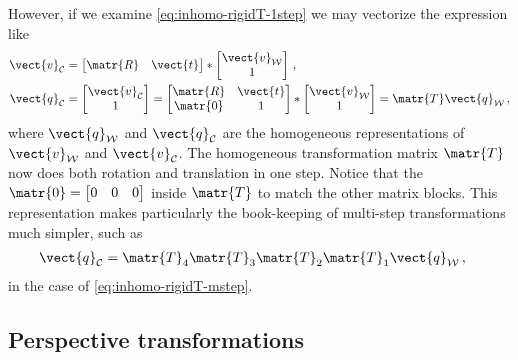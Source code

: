 \documentclass[oneandhalfcolumn]{coursenotes-handout}
\begin{document}
However, if we examine \cref{eq:inhomo-rigidT-1step} we may vectorize the expression like
\begin{align}
    \vect{v}_{\mathcal{C}} &= \begin{bmatrix} \matr{R} & \vect{t} \end{bmatrix} * \begin{bmatrix} \vect{v}_{\mathcal{W}} \\ 1 \end{bmatrix} \,, \\
    \vect{q}_{\mathcal{C}} &= \begin{bmatrix} \vect{v}_{\mathcal{C}} \\ 1 \end{bmatrix} = \begin{bmatrix} \matr{R} & \vect{t} \\ \matr{0} & 1 \end{bmatrix} * \begin{bmatrix} \vect{v}_{\mathcal{W}} \\ 1 \end{bmatrix} = \matr{T} \vect{q}_{\mathcal{W}} \,,
\end{align}
where \(\vect{q}_{\mathcal{W}}\) and \(\vect{q}_{\mathcal{C}}\) are the homogeneous representations of \(\vect{v}_{\mathcal{W}}\) and \(\vect{v}_{\mathcal{C}}\). The homogeneous transformation matrix \(\matr{T}\) now does both rotation and translation in one step. Notice that the \(\matr{0} = \begin{bmatrix} 0 & 0 & 0 \end{bmatrix}\) inside \(\matr{T}\) to match the other matrix blocks. This representation makes particularly the book-keeping of multi-step transformations much simpler, such as
\begin{align}
    \vect{q}_{\mathcal{C}} &= \matr{T}_4 \matr{T}_3 \matr{T}_2 \matr{T}_1 \vect{q}_{\mathcal{W}} \,, \label{eq:hom-rigidT-mstep}
\end{align}
in the case of \cref{eq:inhomo-rigidT-mstep}.


\subsection{Perspective transformations}
\end{document}
